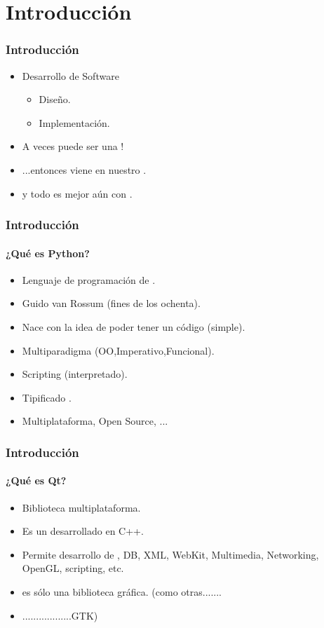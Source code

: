 \section{Introducción}
\frame
{
\frametitle{Introducción}
\begin{itemize}
	\item<1-> Desarrollo de Software
	\begin{itemize}
		\item<2-> Diseño.
		\item<3-> Implementación.
	\end{itemize}
	\item<4-> A veces puede ser una !
	\item<5-> ...entonces  viene en nuestro .
	\item<6-> y todo es mejor aún con .
\end{itemize}
}

\frame
{
\frametitle{Introducción}
\framesubtitle{¿Qué es Python?}

\begin{itemize}
	\item<1-> Lenguaje de programación de .
	\item<2-> Guido van Rossum (fines de los ochenta).
	\item<3-> Nace con la idea de poder tener un código  (simple).
	\item<4-> Multiparadigma (OO,Imperativo,Funcional).
	\item<5-> Scripting (interpretado).
	\item<6-> Tipificado .
	\item<7-> Multiplataforma, Open Source, ...
\end{itemize}
}

\frame
{
\frametitle{Introducción}
\framesubtitle{¿Qué es Qt?}
\begin{itemize}
	\item<1-> Biblioteca multiplataforma.
	\item<2-> Es un  desarrollado en C++.
	\item<3-> Permite desarrollo de , DB, XML, WebKit, Multimedia, Networking, OpenGL, scripting, etc.
	\item<4->  es sólo una biblioteca gráfica. (como otras.......
	\item<5-> ..................GTK)
\end{itemize}
}

